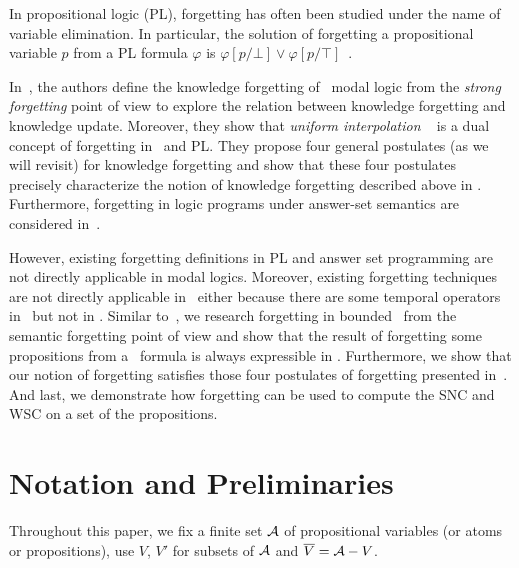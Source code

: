 \documentclass{article}
\begin{document}
In propositional logic (PL), forgetting has often been studied under the name of variable
elimination. In particular, the solution of forgetting a propositional variable $p$ from a PL formula $\varphi$ is $\varphi[p/\bot] \vee \varphi[p/\top]$~\cite{lin1994forget}. %

In~\cite{Yan:AIJ:2009}, the authors define the knowledge forgetting of \SFive\ modal logic from the \emph{strong forgetting} point of view to explore the relation between knowledge forgetting and knowledge update. Moreover, they show that \emph{uniform interpolation} ~\cite{visser1996uniform} is a dual concept of forgetting in \SFive\ and PL.  They propose four general postulates (as we will revisit) for knowledge forgetting and show that these four postulates precisely characterize the notion of knowledge forgetting described above in \SFive.
Furthermore, forgetting in logic programs under answer-set semantics are considered in~\cite{DBLP:Zhang:AIJ2006,DBLP:journals/ai/EiterW08,Wong:PhD:Thesis,Yisong:JAIR,Yisong:IJCAI:2013}.


However, existing forgetting definitions in PL and answer set programming are not directly applicable in modal logics.
Moreover, existing forgetting techniques are not directly applicable in \CTL\ either because there are some temporal operators in \CTL\ but not in \SFive.
Similar to~\cite{Yan:AIJ:2009}, we research forgetting in bounded \CTL\ from the semantic forgetting point of view and show that the result of forgetting some propositions from a \CTL\ formula is always expressible in \CTL.
Furthermore, we show that our notion of forgetting satisfies those four postulates of forgetting presented in~\cite{Yan:AIJ:2009}.
And last, we demonstrate how forgetting can be used to compute the SNC and WSC on a set of the propositions.






\section{Notation and Preliminaries}
\label{preliminaries}
 Throughout this paper, we fix a finite set ${\cal A}$ of propositional variables (or atoms or propositions), use $V$, $V'$ for subsets of ${\cal A}$ and $\overline V = {\cal A} - V$.
\end{document}
